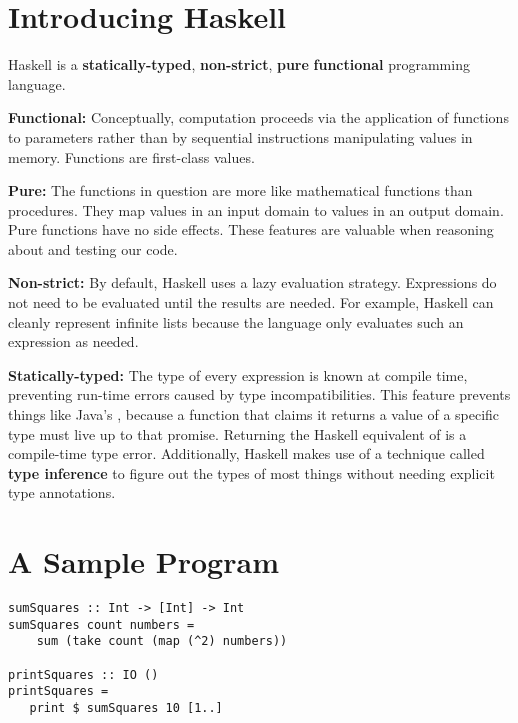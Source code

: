 \section{Introducing Haskell}
\begin{notelist}
\item Haskell is a \textbf{statically-typed}, \textbf{non-strict}, \textbf{pure} \textbf{functional}
      programming language.
	\begin{notelist}
	\item \textbf{Functional:} Conceptually, computation proceeds via the application of functions to parameters rather than by 
          sequential instructions manipulating values in memory. Functions are first-class values.
	\item \textbf{Pure:} The functions in question are more like mathematical functions than procedures. They map values in an input domain
          to values in an output domain. Pure functions have no side effects. These features are valuable when reasoning about
          and testing our code.
	\item \textbf{Non-strict:} By default, Haskell uses a lazy evaluation strategy. Expressions do not need to be evaluated until the 
          results are needed. For example, Haskell can cleanly represent infinite lists because the language only evaluates such
          an expression as needed.
    \item \textbf{Statically-typed:} The type of every expression is known at compile time, preventing run-time errors caused by type
          incompatibilities. This feature prevents things like Java's , because a function that claims it returns
          a value of a specific type must live up to that promise. Returning the Haskell equivalent of  is a compile-time
          type error. Additionally, Haskell makes use of a technique called \textbf{type inference} to figure out the types of most things
          without needing explicit type annotations.
	\end{notelist}
\end{notelist}

\section{A Sample Program}

\begin{lstlisting}
sumSquares :: Int -> [Int] -> Int
sumSquares count numbers =
    sum (take count (map (^2) numbers))

printSquares :: IO ()
printSquares =
   print $ sumSquares 10 [1..]
\end{lstlisting}

